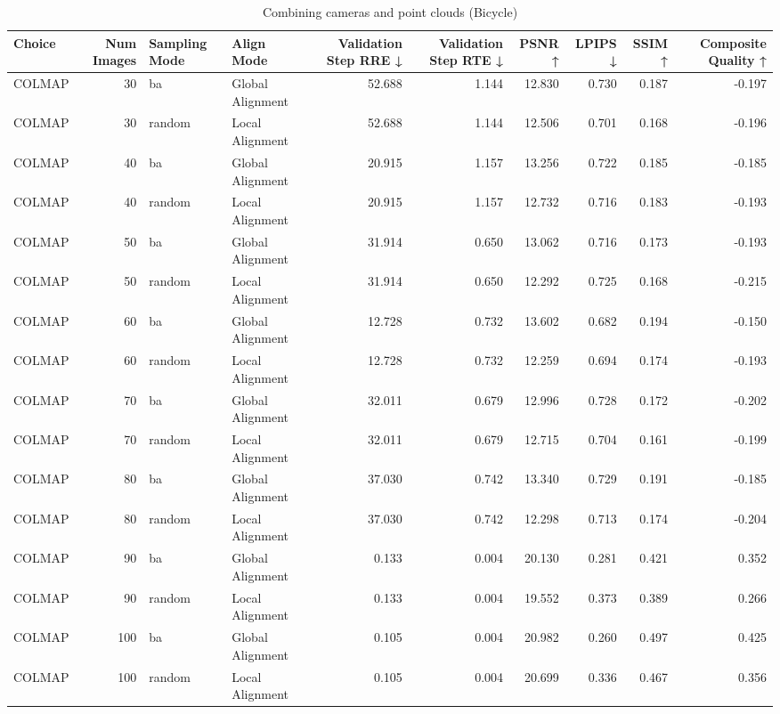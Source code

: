\begin{table}[H]
\caption{Combining cameras and point clouds (Bicycle)}
\label{tab:11_combined_align_bicycle}
\begin{tabular}{lrllrrrrrr}
\toprule
Choice & Num Images & Sampling Mode & Align Mode & Validation Step RRE ↓ & Validation Step RTE ↓ & PSNR ↑ & LPIPS ↓ & SSIM ↑ & Composite Quality ↑ \\
\midrule
COLMAP & 30 & ba & Global Alignment & 52.688 & 1.144 & 12.830 & 0.730 & 0.187 & -0.197 \\
COLMAP & 30 & random & Local Alignment & 52.688 & 1.144 & 12.506 & 0.701 & 0.168 & -0.196 \\
COLMAP & 40 & ba & Global Alignment & 20.915 & 1.157 & 13.256 & 0.722 & 0.185 & -0.185 \\
COLMAP & 40 & random & Local Alignment & 20.915 & 1.157 & 12.732 & 0.716 & 0.183 & -0.193 \\
COLMAP & 50 & ba & Global Alignment & 31.914 & 0.650 & 13.062 & 0.716 & 0.173 & -0.193 \\
COLMAP & 50 & random & Local Alignment & 31.914 & 0.650 & 12.292 & 0.725 & 0.168 & -0.215 \\
COLMAP & 60 & ba & Global Alignment & 12.728 & 0.732 & 13.602 & 0.682 & 0.194 & -0.150 \\
COLMAP & 60 & random & Local Alignment & 12.728 & 0.732 & 12.259 & 0.694 & 0.174 & -0.193 \\
COLMAP & 70 & ba & Global Alignment & 32.011 & 0.679 & 12.996 & 0.728 & 0.172 & -0.202 \\
COLMAP & 70 & random & Local Alignment & 32.011 & 0.679 & 12.715 & 0.704 & 0.161 & -0.199 \\
COLMAP & 80 & ba & Global Alignment & 37.030 & 0.742 & 13.340 & 0.729 & 0.191 & -0.185 \\
COLMAP & 80 & random & Local Alignment & 37.030 & 0.742 & 12.298 & 0.713 & 0.174 & -0.204 \\
COLMAP & 90 & ba & Global Alignment & 0.133 & 0.004 & 20.130 & 0.281 & 0.421 & 0.352 \\
COLMAP & 90 & random & Local Alignment & 0.133 & 0.004 & 19.552 & 0.373 & 0.389 & 0.266 \\
COLMAP & 100 & ba & Global Alignment & 0.105 & 0.004 & 20.982 & 0.260 & 0.497 & 0.425 \\
COLMAP & 100 & random & Local Alignment & 0.105 & 0.004 & 20.699 & 0.336 & 0.467 & 0.356 \\
\bottomrule
\end{tabular}
\end{table}
